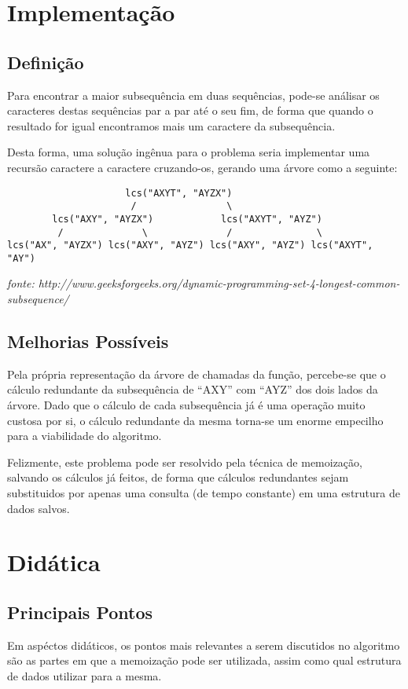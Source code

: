\documentclass[11pt]{article}
\begin{document}
\section{Implementação}

\subsection{Definição}
Para encontrar a maior subsequência em duas sequências, pode-se análisar os
caracteres destas sequências par a par até o seu fim, de forma que quando o
resultado for igual encontramos mais um caractere da subsequência.

Desta forma, uma solução ingênua para o problema seria implementar uma recursão
caractere a caractere cruzando-os, gerando uma árvore como a seguinte:

\begin{lstlisting}
                     lcs("AXYT", "AYZX")
                      /                \
        lcs("AXY", "AYZX")            lcs("AXYT", "AYZ")
         /              \              /               \
lcs("AX", "AYZX") lcs("AXY", "AYZ") lcs("AXY", "AYZ") lcs("AXYT", "AY")
\end{lstlisting}
\emph{fonte: http://www.geeksforgeeks.org/dynamic-programming-set-4-longest-common-subsequence/}

\subsection{Melhorias Possíveis}
Pela própria representação da árvore de chamadas da função, percebe-se que o
cálculo redundante da subsequência de ``AXY'' com ``AYZ'' dos dois lados da
árvore. Dado que o cálculo de cada subsequência já é uma operação muito custosa
por si, o cálculo redundante da mesma torna-se um enorme empecilho para a
viabilidade do algoritmo.

Felizmente, este problema pode ser resolvido pela técnica de memoização,
salvando os cálculos já feitos, de forma que cálculos redundantes sejam
substituidos por apenas uma consulta (de tempo constante) em uma estrutura de
dados salvos.

\section{Didática}

\subsection{Principais Pontos}
Em aspéctos didáticos, os pontos mais relevantes a serem discutidos no algoritmo
são as partes em que a memoização pode ser utilizada, assim como qual estrutura
de dados utilizar para a mesma.
\end{document}
